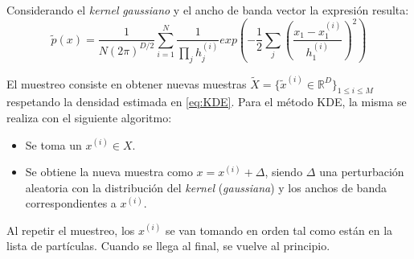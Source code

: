 Considerando el \emph{kernel} \emph{gaussiano} y el ancho de banda vector la expresión resulta:
\begin{equation}
    \label{eq:KDE-gauss}
    \tilde{p}(x) = \frac{1}{N (2\pi)^{D/2}} \sum_{i=1}^N \frac{1}{\prod_j h_j^{(i)}} exp\left(-\frac{1}{2} \sum_j \left(\frac{x_1-x_1^{(i)}}{h_1^{(i)}}\right)^2\right)
\end{equation}

El muestreo consiste en obtener nuevas muestras $\tilde{X} = \{\tilde{x}^{(i)} \in \mathbb{R}^D\}_{1\leq i \leq M}$ respetando la densidad estimada en \ref{eq:KDE}. Para el método KDE, la misma se realiza con el siguiente algoritmo:
\begin{itemize}
    \item Se toma un $x^{(i)} \in X$.
    \item Se obtiene la nueva muestra como $x = x^{(i)} + \Delta$, siendo $\Delta$ una perturbación aleatoria con la distribución del \emph{kernel} (\emph{gaussiana}) y los anchos de banda correspondientes a $x^{(i)}$.
\end{itemize}
Al repetir el muestreo, los $x^{(i)}$ se van tomando en orden tal como están en la lista de partículas. Cuando se llega al final, se vuelve al principio.

